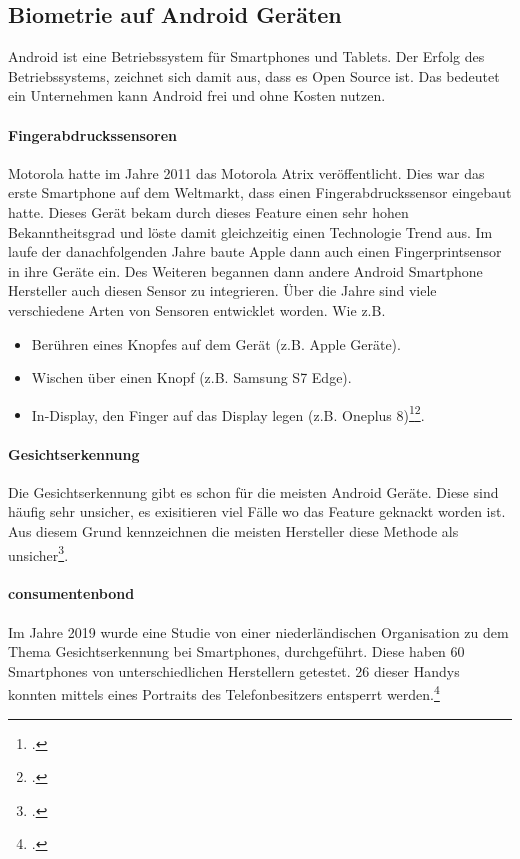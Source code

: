 \subsection{Biometrie auf Android Geräten}
Android ist eine Betriebssystem für Smartphones und Tablets. Der Erfolg des Betriebssystems, zeichnet sich damit aus, dass es Open Source ist. Das bedeutet ein Unternehmen kann Android frei und ohne Kosten nutzen.
\paragraph{Fingerabdruckssensoren}
Motorola hatte im Jahre 2011 das Motorola Atrix veröffentlicht. Dies war das erste Smartphone auf dem Weltmarkt, dass einen Fingerabdruckssensor eingebaut hatte.
Dieses Gerät bekam durch dieses Feature einen sehr hohen Bekanntheitsgrad und löste damit gleichzeitig einen Technologie Trend aus.
Im laufe der danachfolgenden Jahre baute Apple dann auch einen Fingerprintsensor in ihre Geräte ein. Des Weiteren begannen dann andere Android Smartphone Hersteller auch diesen Sensor zu integrieren.
Über die Jahre sind viele verschiedene Arten von Sensoren entwicklet worden. Wie z.B.
\begin{itemize}
	\item Berühren eines Knopfes auf dem Gerät (z.B. Apple Geräte).
	\item Wischen über einen Knopf (z.B. Samsung S7 Edge).
	\item In-Display, den Finger auf das Display legen (z.B. Oneplus 8)\footcite{fingerabdruck-android-1}\footcite{fingerabdruck-android-2}. 
\end{itemize}
\paragraph{Gesichtserkennung}
Die Gesichtserkennung gibt es schon für die meisten Android Geräte. Diese sind häufig sehr unsicher, es exisitieren viel Fälle wo das Feature geknackt worden ist. Aus diesem Grund kennzeichnen die meisten Hersteller diese Methode als unsicher\footcite{gesichtserkennung-android}. 

\paragraph{consumentenbond}
Im Jahre 2019 wurde eine Studie von einer niederländischen Organisation zu dem Thema Gesichtserkennung bei Smartphones, durchgeführt. 
Diese haben 60 Smartphones von unterschiedlichen Herstellern getestet. 26 dieser Handys konnten mittels eines Portraits des Telefonbesitzers entsperrt werden.\footcite{consumentenbond}

